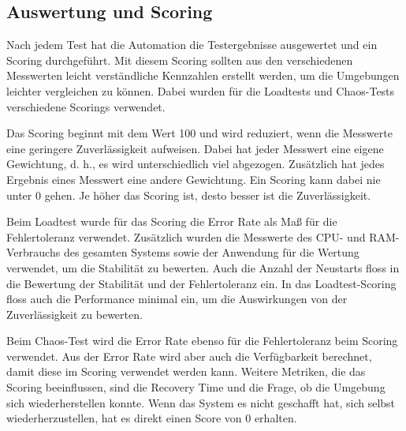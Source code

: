 \subsection{Auswertung und Scoring}
Nach jedem Test hat die Automation die Testergebnisse ausgewertet und ein Scoring durchgeführt.
Mit diesem Scoring sollten aus den verschiedenen Messwerten leicht verständliche Kennzahlen erstellt werden, um die Umgebungen leichter vergleichen zu können. Dabei wurden für die Loadtests und Chaos-Tests verschiedene Scorings verwendet.

Das Scoring beginnt mit dem Wert 100 und wird reduziert, wenn die Messwerte eine geringere Zuverlässigkeit aufweisen.
Dabei hat jeder Messwert eine eigene Gewichtung, d. h., es wird unterschiedlich viel abgezogen. Zusätzlich hat jedes Ergebnis eines Messwert eine andere Gewichtung.
Ein Scoring kann dabei nie unter 0 gehen. Je höher das Scoring ist, desto besser ist die Zuverlässigkeit.

Beim Loadtest wurde für das Scoring die Error Rate als Maß für die Fehlertoleranz verwendet.
Zusätzlich wurden die Messwerte des CPU- und RAM-Verbrauchs des gesamten Systems sowie der Anwendung für die Wertung verwendet, um die Stabilität zu bewerten.
Auch die Anzahl der Neustarts floss in die Bewertung der Stabilität und der Fehlertoleranz ein.
In das Loadtest-Scoring floss auch die Performance minimal ein, um die Auswirkungen von der Zuverlässigkeit zu bewerten.

Beim Chaos-Test wird die Error Rate ebenso für die Fehlertoleranz beim Scoring verwendet.
Aus der Error Rate wird aber auch die Verfügbarkeit berechnet, damit diese im Scoring verwendet werden kann.
Weitere Metriken, die das Scoring beeinflussen, sind die Recovery Time und die Frage, ob die Umgebung sich wiederherstellen konnte.
Wenn das System es nicht geschafft hat, sich selbst wiederherzustellen, hat es direkt einen Score von 0 erhalten.